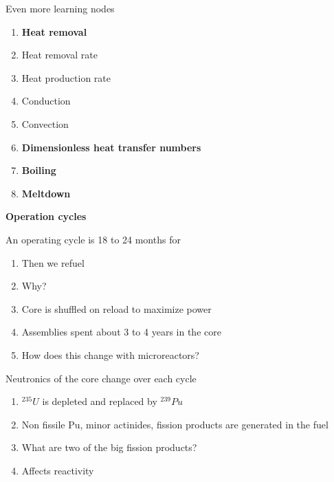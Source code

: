 \documentclass[aspectratio=1610,pdftex,dvipsnames,compress,xcolor={dvipsnames}]{beamer}
\newcommand{\acsp}{\acrshortpl} %
\begin{document}
\begin{frame}{Even more learning nodes}
    \begin{enumerate}[series=outerlist,topsep=0pt,itemsep=1pt,leftmargin=*,label=(\arabic*)]
                \item[]\textbf{Heat removal}
                \item[]Heat removal rate
                \item[]Heat production rate
                \item[]Conduction
                \item[]Convection
                    \vspace{0.15in}
                \item[]\textbf{Dimensionless heat transfer numbers}
                    \vspace{0.15in}
                \item[]\textbf{Boiling}
                    \vspace{0.15in}
                \item[]\textbf{Meltdown}
    \end{enumerate}
\end{frame}


\begin{frame}[plain]{}
    \centering\LARGE\textbf{Operation cycles}
\end{frame}


\addtocounter{framenumber}{-1} 
\begin{frame}{An operating cycle is 18 to 24 months for \acsp{lwr}}
    \begin{enumerate}[series=outerlist,topsep=0pt,itemsep=21pt,leftmargin=*,label=(\arabic*)]
        \item[]Then we refuel
        \item[]Why?
        \item[]Core is shuffled on reload to maximize power
        \item[]Assemblies spent about 3 to 4 years in the core
        \item[]How does this change with microreactors?
    \end{enumerate}
\end{frame}


\begin{frame}{Neutronics of the core change over each cycle}
    \begin{enumerate}[series=outerlist,topsep=0pt,itemsep=21pt,leftmargin=*,label=(\arabic*)]
        \item[]$^{235}U$ is depleted and replaced by $^{239}Pu$
        \item[]Non fissile Pu, minor actinides, fission products are generated in the fuel
        \item[]What are two of the big fission products?
        \item[]Affects reactivity
    \end{enumerate}
\end{frame}
\end{document}
